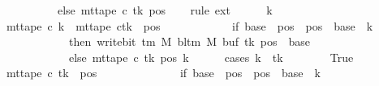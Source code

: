 \begin{isabellebody}
\ \ \ \ \ \ \ \ \ \ else\ mt{\isacharunderscore}{\kern0pt}tape\ c{\isacharprime}{\kern0pt}\ tk\ pos{\isacharparenright}{\kern0pt}{\isacharparenright}{\kern0pt}{\isachardoublequoteclose}\isanewline
\ \ \isamarkupfalse%
\ {\isacharparenleft}{\kern0pt}rule\ ext{\isacharparenright}{\kern0pt}\isanewline
\ \ \ \ \isamarkupfalse%
\ k{\isacharprime}{\kern0pt}\isanewline
\ \ \ \ \isamarkupfalse%
\ {\isachardoublequoteopen}mt{\isacharunderscore}{\kern0pt}tape\ c{}\ k{\isacharprime}{\kern0pt}\ {\isacharequal}{\kern0pt}\ {\isacharparenleft}{\kern0pt}{\isacharparenleft}{\kern0pt}mt{\isacharunderscore}{\kern0pt}tape\ c{\isacharprime}{\kern0pt}{\isacharparenright}{\kern0pt}{\isacharparenleft}{\kern0pt}tk\ {\isacharcolon}{\kern0pt}{\isacharequal}{\kern0pt}\ {\isacharparenleft}{\kern0pt}{\isasymlambda}pos{\isachardot}{\kern0pt}\isanewline
\ \ \ \ \ \ \ \ \ \ \ \ if\ base\ {\isasymle}\ pos\ {\isasymand}\ pos\ {\isacharless}{\kern0pt}\ base\ {\isacharplus}{\kern0pt}\ {\isacharparenleft}{\kern0pt}{\isacharquery}{\kern0pt}k\ {\isacharminus}{\kern0pt}\ {}{\isacharparenright}{\kern0pt}\isanewline
\ \ \ \ \ \ \ \ \ \ \ \ then\ write{\isacharunderscore}{\kern0pt}bit\ {\isacharparenleft}{\kern0pt}{\isasymGamma}{\isacharunderscore}{\kern0pt}tm\ M{\isacharparenright}{\kern0pt}\ {\isacharparenleft}{\kern0pt}bl{\isacharunderscore}{\kern0pt}tm\ M{\isacharparenright}{\kern0pt}\ {\isacharparenleft}{\kern0pt}buf\ tk{\isacharparenright}{\kern0pt}\ {\isacharparenleft}{\kern0pt}pos\ {\isacharminus}{\kern0pt}\ base{\isacharparenright}{\kern0pt}\isanewline
\ \ \ \ \ \ \ \ \ \ \ \ else\ mt{\isacharunderscore}{\kern0pt}tape\ c{\isacharprime}{\kern0pt}\ tk\ pos{\isacharparenright}{\kern0pt}{\isacharparenright}{\kern0pt}{\isacharparenright}{\kern0pt}\ k{\isacharprime}{\kern0pt}{\isachardoublequoteclose}\isanewline
\ \ \ \ \isamarkupfalse%
\ {\isacharparenleft}{\kern0pt}cases\ {\isachardoublequoteopen}k{\isacharprime}{\kern0pt}\ {\isacharequal}{\kern0pt}\ tk{\isachardoublequoteclose}{\isacharparenright}{\kern0pt}\isanewline
\ \ \ \ \ \ \isamarkupfalse%
\ True\isanewline
\ \ \ \ \ \ \isamarkupfalse%
\ {\isachardoublequoteopen}mt{\isacharunderscore}{\kern0pt}tape\ c{}\ tk\ {\isacharequal}{\kern0pt}\ {\isacharparenleft}{\kern0pt}{\isasymlambda}pos{\isachardot}{\kern0pt}\isanewline
\ \ \ \ \ \ \ \ \ \ \ \ \ \ if\ base\ {\isasymle}\ pos\ {\isasymand}\ pos\ {\isacharless}{\kern0pt}\ base\ {\isacharplus}{\kern0pt}\ {\isacharparenleft}{\kern0pt}{\isacharquery}{\kern0pt}k\ {\isacharminus}{\kern0pt}\ {}{\isacharparenright}{\kern0pt}\isanewline

\end{isabellebody}
